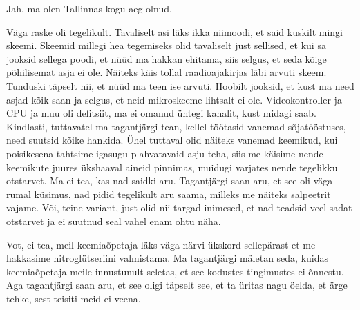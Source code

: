 Jah, ma olen Tallinnas kogu aeg olnud. 


Väga raske oli tegelikult. Tavaliselt asi läks ikka niimoodi, et said kuskilt mingi skeemi. Skeemid millegi hea tegemiseks olid tavaliselt just sellised, et kui sa jooksid sellega poodi, et nüüd ma hakkan  ehitama, siis selgus, et seda kõige põhilisemat asja ei ole. Näiteks käis tollal raadioajakirjas läbi arvuti skeem. Tunduski täpselt nii, et  nüüd ma teen ise arvuti. Hoobilt jooksid, et kust ma need asjad kõik saan ja selgus, et neid mikroskeeme lihtsalt ei ole. Videokontroller ja CPU ja muu oli defitsiit, ma ei omanud ühtegi kanalit, kust midagi saab. Kindlasti, tuttavatel ma tagantjärgi tean, kellel töötasid  vanemad sõjatööstuses, need suutsid kõike hankida. Ühel tuttaval olid näiteks vanemad keemikud,  kui poisikesena tahtsime igasugu plahvatavaid asju teha, siis me käisime nende keemikute juures ükshaaval aineid pinnimas, muidugi varjates nende tegelikku otstarvet. Ma ei tea, kas nad saidki aru. Tagantjärgi saan aru, et see oli väga rumal küsimus, nad pidid tegelikult aru saama, milleks me  näiteks salpeetrit vajame. Või, teine variant, just olid nii targad inimesed, et nad teadsid veel sadat otstarvet ja ei suutnud seal vahel enam ohtu näha. 


Vot, ei tea, meil keemiaõpetaja läks väga närvi ükskord sellepärast et me hakkasime nitroglütseriini valmistama. Ma tagantjärgi mäletan seda, kuidas keemiaõpetaja meile innustunult seletas, et see kodustes tingimustes ei õnnestu. Aga tagantjärgi saan aru, et see oligi täpselt see, et ta üritas nagu öelda, et ärge tehke, sest teisiti meid ei veena. 


